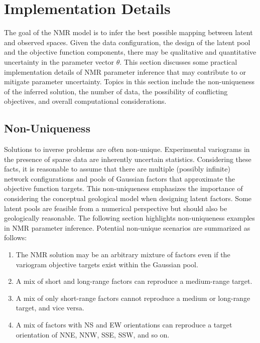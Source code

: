 \FloatBarrier
\section{Implementation Details}
\label{sec:04implementd}

The goal of the \gls{NMR} model is to infer the best possible mapping between latent and observed spaces. Given the data configuration, the design of the latent pool and the objective function components, there may be qualitative and quantitative uncertainty in the parameter vector $\theta$. This section discusses some practical implementation details of \gls{NMR} parameter inference that may contribute to or mitigate parameter uncertainty. Topics in this section include the non-uniqueness of the inferred solution, the number of data, the possibility of conflicting objectives, and overall computational considerations.

\subsection{Non-Uniqueness}
\label{subsec:04nonunique}

Solutions to inverse problems are often non-unique. Experimental variograms in the presence of sparse data are inherently uncertain statistics. Considering these facts, it is reasonable to assume that there are multiple (possibly infinite) network configurations and pools of Gaussian factors that approximate the objective function targets. This non-uniqueness emphasizes the importance of considering the conceptual geological model when designing latent factors. Some latent pools are feasible from a numerical perspective but should also be geologically reasonable. The following section highlights non-uniqueness examples in \gls{NMR} parameter inference. Potential non-unique scenarios are summarized as follows:
\begin{enumerate}[noitemsep]
    \item The \gls{NMR} solution may be an arbitrary mixture of factors even if the variogram objective targets exist within the Gaussian pool.
    \item A mix of short and long-range factors can reproduce a medium-range target.
    \item A mix of only short-range factors cannot reproduce a medium or long-range target, and vice versa.
    \item A mix of factors with NS and EW orientations can reproduce a target orientation of NNE, NNW, SSE, SSW, and so on.
\end{enumerate}

